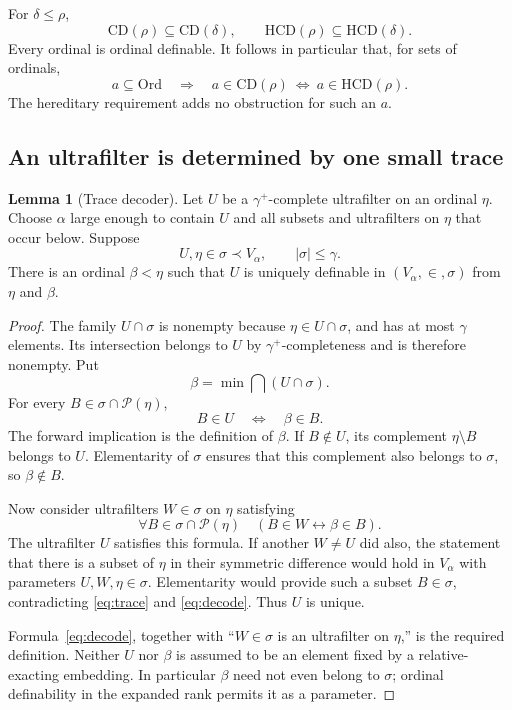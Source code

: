 \documentclass[11pt,letterpaper]{article}
\theoremstyle{definition}
\newtheorem{lemma}[definition]{Lemma}
\newcommand{\Ord}{\mathrm{Ord}}
\newcommand{\CD}{\mathrm{CD}}
\newcommand{\HCD}{\mathrm{HCD}}
\newcommand{\Pow}{\mathcal{P}}
\begin{document}
For $\delta\leq\rho$,
\begin{equation}\label{eq:monotone}
 \CD(\rho)\subseteq\CD(\delta),
 \qquad \HCD(\rho)\subseteq\HCD(\delta).
\end{equation}
Every ordinal is ordinal definable. It follows in particular that, for sets of ordinals,
\begin{equation}\label{eq:setsord}
 a\subseteq\Ord\quad\Longrightarrow\quad
 a\in\CD(\rho)\ \Longleftrightarrow\ a\in\HCD(\rho).
\end{equation}
The hereditary requirement adds no obstruction for such an $a$.

\subsection{An ultrafilter is determined by one small trace}

\begin{lemma}[Trace decoder]\label{lem:trace}
Let $U$ be a $\gamma^+$-complete ultrafilter on an ordinal $\eta$. Choose $\alpha$ large enough to contain $U$ and all subsets and ultrafilters on $\eta$ that occur below. Suppose
\[
 U,\eta\in\sigma\prec V_\alpha,
 \qquad |\sigma|\leq\gamma.
\]
There is an ordinal $\beta<\eta$ such that $U$ is uniquely definable in $(V_\alpha,\in,\sigma)$ from $\eta$ and $\beta$.
\end{lemma}

\begin{proof}
The family $U\cap\sigma$ is nonempty because $\eta\in U\cap\sigma$, and has at most $\gamma$ elements. Its intersection belongs to $U$ by $\gamma^+$-completeness and is therefore nonempty. Put
\[
 \beta=\min\bigcap(U\cap\sigma).
\]
For every $B\in\sigma\cap\Pow(\eta)$,
\begin{equation}\label{eq:trace}
 B\in U\quad\Longleftrightarrow\quad\beta\in B.
\end{equation}
The forward implication is the definition of $\beta$. If $B\notin U$, its complement $\eta\setminus B$ belongs to $U$. Elementarity of $\sigma$ ensures that this complement also belongs to $\sigma$, so $\beta\notin B$.

Now consider ultrafilters $W\in\sigma$ on $\eta$ satisfying
\begin{equation}\label{eq:decode}
 \forall B\in\sigma\cap\Pow(\eta)\quad
       (B\in W\longleftrightarrow\beta\in B).
\end{equation}
The ultrafilter $U$ satisfies this formula. If another $W\neq U$ did also, the statement that there is a subset of $\eta$ in their symmetric difference would hold in $V_\alpha$ with parameters $U,W,\eta\in\sigma$. Elementarity would provide such a subset $B\in\sigma$, contradicting \eqref{eq:trace} and \eqref{eq:decode}. Thus $U$ is unique.

Formula~\eqref{eq:decode}, together with ``$W\in\sigma$ is an ultrafilter on $\eta$,'' is the required definition. Neither $U$ nor $\beta$ is assumed to be an element fixed by a relative-exacting embedding. In particular $\beta$ need not even belong to $\sigma$; ordinal definability in the expanded rank permits it as a parameter.
\end{proof}
\end{document}
